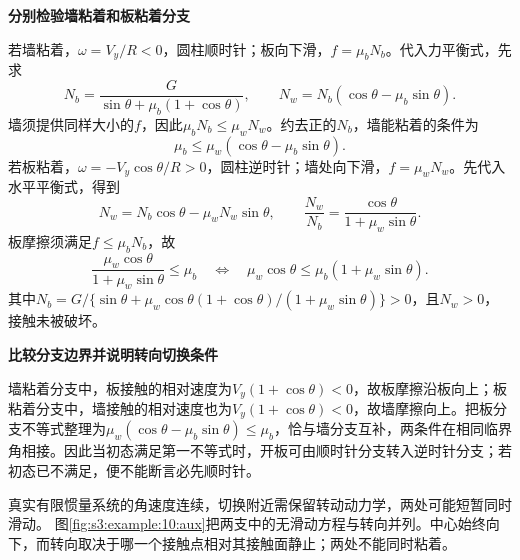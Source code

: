 \begin{solution}
\par\medskip{}\noindent\textbf{分别检验墙粘着和板粘着分支}\par\nobreak
若墙粘着，$\omega=V_y/R<0$，圆柱顺时针；板向下滑，$f=\mu_bN_b$。代入力平衡式，先求
\[
N_b=\frac{G}{\sin\theta+\mu_b(1+\cos\theta)},\qquad
N_w=N_b(\cos\theta-\mu_b\sin\theta).
\]
墙须提供同样大小的$f$，因此$\mu_bN_b\le\mu_wN_w$。约去正的$N_b$，墙能粘着的条件为
\[
\mu_b\le\mu_w(\cos\theta-\mu_b\sin\theta).
\]
若板粘着，$\omega=-V_y\cos\theta/R>0$，圆柱逆时针；墙处向下滑，$f=\mu_wN_w$。先代入水平平衡式，得到
\[
N_w=N_b\cos\theta-\mu_wN_w\sin\theta,
\qquad
\frac{N_w}{N_b}=\frac{\cos\theta}{1+\mu_w\sin\theta}.
\]
板摩擦须满足$f\le\mu_bN_b$，故
\[
\frac{\mu_w\cos\theta}{1+\mu_w\sin\theta}\le\mu_b
\quad\Longleftrightarrow\quad
\mu_w\cos\theta\le\mu_b(1+\mu_w\sin\theta).
\]
其中$N_b=G/\{\sin\theta+\mu_w\cos\theta(1+\cos\theta)/(1+\mu_w\sin\theta)\}>0$，且$N_w>0$，接触未被破坏。



\par\medskip{}\noindent\textbf{比较分支边界并说明转向切换条件}\par\nobreak
墙粘着分支中，板接触的相对速度为$V_y(1+\cos\theta)<0$，故板摩擦沿板向上；板粘着分支中，墙接触的相对速度也为$V_y(1+\cos\theta)<0$，故墙摩擦向上。把板分支不等式整理为$\mu_w(\cos\theta-\mu_b\sin\theta)\le\mu_b$，恰与墙分支互补，两条件在相同临界角相接。因此当初态满足第一不等式时，开板可由顺时针分支转入逆时针分支；若初态已不满足，便不能断言必先顺时针。

真实有限惯量系统的角速度连续，切换附近需保留转动动力学，两处可能短暂同时滑动。
图\ref{fig:s3:example:10:aux}把两支中的无滑动方程与转向并列。中心始终向下，而转向取决于哪一个接触点相对其接触面静止；两处不能同时粘着。\end{solution}
